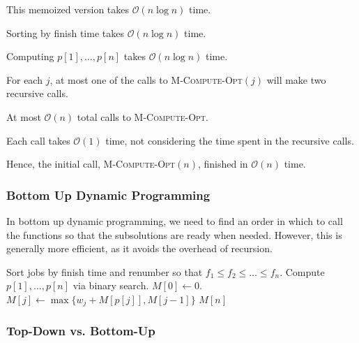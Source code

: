 \begin{claim}
    This memoized version takes $\mathcal{O}(n \log n)$ time.
\end{claim}

\begin{listu}
    \item Sorting by finish time takes $\mathcal{O}(n \log n)$ time.
    \item Computing $p[1], \dots, p[n]$ takes $\mathcal{O}(n \log n)$ time.
    \item For each $j$, at most one of the calls to \textsc{M-Compute-Opt}$(j)$ will make two recursive calls.
    \begin{listu}
        \item At most $\mathcal{O}(n)$ total calls to \textsc{M-Compute-Opt}.
        \item Each call takes $\mathcal{O}(1)$ time, not considering the time spent in the recursive calls. 
        \item Hence, the initial call, \textsc{M-Compute-Opt}$(n)$, finished in $\mathcal{O}(n)$ time.
    \end{listu}
\end{listu}

\subsubsection{Bottom Up Dynamic Programming}

In bottom up dynamic programming, we need to find an order in which to call the functions so that the subsolutions are ready when needed. However, this is generally more efficient, as it avoids the overhead of recursion.

\begin{algorithm}[ht!]
    \begin{algorithmic}[1]
            \State Sort jobs by finish time and renumber so that $f_1 \leq f_2 \leq \ldots \leq f_n$.
            \State Compute $p[1], \dots, p[n]$ via binary search.
            \State $M[0] \gets 0$.
                \State $M[j] \gets \max\{w_j + M[p[j]], M[j - 1]\}$
            \EndFor
            \State \Return $M[n]$
        \EndFunction
    \end{algorithmic}
\end{algorithm}

\subsubsection{Top-Down vs. Bottom-Up}

